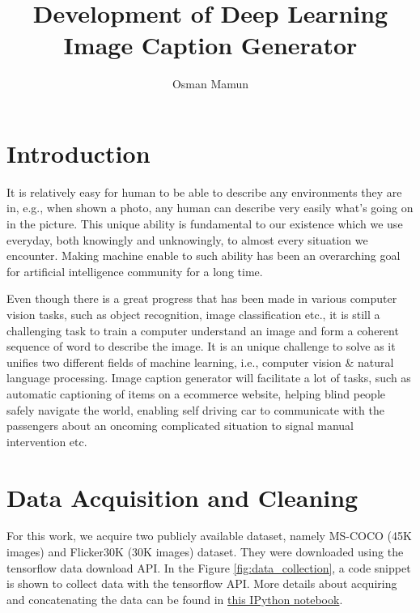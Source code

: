 \documentclass[12pt]{article}
\author{Osman Mamun}
\title{Development of Deep Learning Image Caption Generator}
\begin{document}
\setcounter{page}{-2}
\maketitle
\thispagestyle{empty}
\thispagestyle{empty}
\newpage
\begingroup
\def\addvspace#1{}
\tableofcontents
\endgroup
\thispagestyle{empty}
\newpage
\large
{}
\section{Introduction}
\label{Sec:intro}
It is relatively easy for human to be able to describe any environments they are in, e.g., when shown a photo, any human can describe very easily what's going on in the picture. This unique ability is fundamental to our existence which we use everyday, both knowingly and unknowingly, to almost every situation we encounter. Making machine enable to such ability has been an overarching goal for artificial intelligence community for a long time.

Even though there is a great progress that has been made in various computer vision tasks, such as object recognition, image classification etc., it is still a challenging task to train a computer understand an image and form a coherent sequence of word to describe the image. It is an unique challenge to solve as it unifies two different fields of machine learning, i.e., computer vision & natural language processing. Image caption generator will facilitate a lot of tasks, such as automatic captioning of items on a ecommerce website, helping blind people safely navigate the world, enabling self driving car to communicate with the passengers about an oncoming complicated situation to signal manual intervention etc.


\section{Data Acquisition and Cleaning}
\label{sec:dataclean}

For this work, we acquire two publicly available dataset, namely MS-COCO (45K images) and Flicker30K (30K images) dataset. They were downloaded using the tensorflow data download API. In the Figure \ref{fig:data_collection}, a code snippet is shown to collect data with the tensorflow API. More details about
acquiring and concatenating the data can be found in \href{https://github.com/mamunm/iamge_caption_generator/blob/main/notebooks/data_download.ipynb}{this IPython notebook}.
\end{document}
